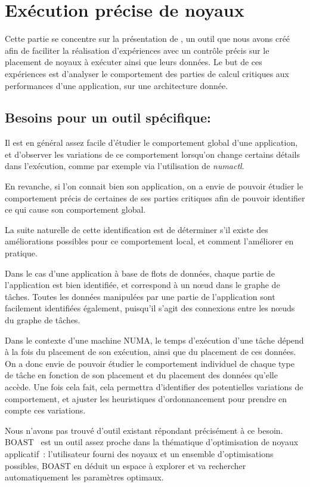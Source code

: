 \section{Exécution précise de noyaux}\label{sec:contribs:outil}

Cette partie se concentre sur la présentation de \outil, un outil que nous avons créé afin de faciliter la réalisation d'expériences avec un contrôle précis sur le placement de noyaux à exécuter ainsi que leurs données.
Le but de ces expériences est d'analyser le comportement des parties de calcul critiques aux performances d'une application, sur une architecture donnée.

\subsection{Besoins pour un outil spécifique: \outil}

Il est en général assez facile d'étudier le comportement global d'une application, et d'observer les variations de ce comportement lorsqu'on change certains détails dans l'exécution, comme par exemple via l'utilisation de \emph{numactl}.

En revanche, si l'on connait bien son application, on a envie de pouvoir étudier le comportement précis de certaines de ses parties critiques afin de pouvoir identifier ce qui cause son comportement global.

La suite naturelle de cette identification est de déterminer s'il existe des améliorations possibles pour ce comportement local, et comment l'améliorer en pratique.

Dans le cas d'une application à base de flots de données, chaque partie de l'application est bien identifiée, et correspond à un nœud dans le graphe de tâches.
Toutes les données manipulées par une partie de l'application sont facilement identifiées également, puisqu'il s'agit des connexions entre les nœuds du graphe de tâches.

Dans le contexte d'une machine NUMA, le temps d'exécution d'une tâche dépend à la fois du placement de son exécution, ainsi que du placement de ces données. On a donc envie de pouvoir étudier le comportement individuel de chaque type de tâche en fonction de son placement et du placement des données qu'elle accède.
Une fois cela fait, cela permettra d'identifier des potentielles variations de comportement, et ajuster les heuristiques d'ordonnancement pour prendre en compte ces variations.

Nous n'avons pas trouvé d'outil existant répondant précisément à ce besoin.
BOAST~\cite{Videau2017} est un outil assez proche dans la thématique d'optimisation de noyaux applicatif~: l'utilisateur fourni des noyaux et un ensemble d'optimisations possibles, BOAST en déduit un espace à explorer et va rechercher automatiquement les paramètres optimaux.

